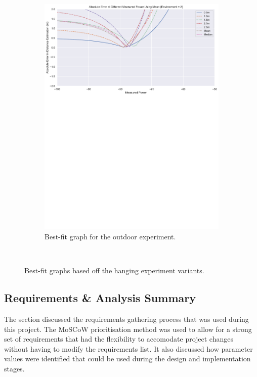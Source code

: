 \documentclass{l4proj}
\begin{document}
\begin{figure}[!htb]
\begin{subfigure}[b]{0.45\textwidth}
        \includegraphics[width=\textwidth]{images/outdoor_hanging_bestfit.pdf}
        \caption{ Best-fit graph for the outdoor experiment. }
        \label{fig:outdoor_hanging_bestfit}
    \end{subfigure}
    ~ %
    \caption{ Best-fit graphs based off the hanging experiment variants. }
    \label{fig:bestfit_plots}
\end{figure}

\subsection{Requirements \& Analysis Summary}

The section discussed the requirements gathering process that was used during this project. The MoSCoW prioritisation method was used to allow for a strong set of requirements that had the flexibility to accomodate project changes without having to modify the requirements list. It also discussed how parameter values were identified that could be used during the design and implementation stages.
\end{document}

